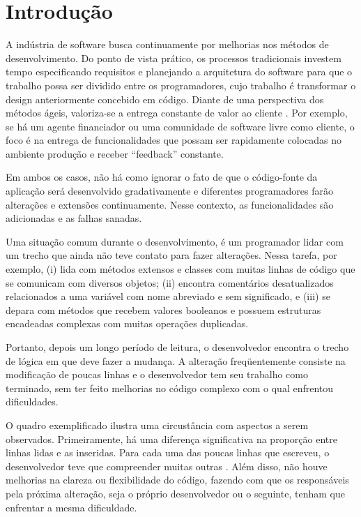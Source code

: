 \chapter{Introdução}
\label{chap:introducao}

A indústria de software busca continuamente por melhorias nos métodos
de desenvolvimento. Do ponto de vista prático, os processos tradicionais investem tempo especificando requisitos
e planejando a arquitetura do software para que o trabalho possa ser dividido entre os
programadores, cujo trabalho é transformar o design anteriormente concebido em código.
Diante de uma perspectiva dos métodos ágeis, valoriza-se a entrega constante 
de valor ao cliente \cite{}. Por exemplo, se há um agente financiador ou uma comunidade de software livre
como cliente, o foco é na entrega de funcionalidades que possam ser rapidamente colocadas
no ambiente produção e receber ``feedback'' constante.

Em ambos os casos, não há como ignorar o fato de que o código-fonte da aplicação será
desenvolvido gradativamente e diferentes programadores farão alterações e extensões
continuamente. Nesse contexto, as funcionalidades são adicionadas e as falhas sanadas.

Uma situação comum durante o desenvolvimento, é um programador lidar com um trecho que
ainda não teve contato para fazer alterações. Nessa tarefa, por exemplo, (i) lida com métodos extensos e classes
com muitas linhas de código que se comunicam com diversos objetos; (ii) encontra comentários
desatualizados relacionados a uma variável com nome abreviado e sem significado, e (iii) se depara com métodos que
recebem valores booleanos e possuem estruturas encadeadas complexas com muitas operações duplicadas.

Portanto, depois um longo período de leitura, o desenvolvedor encontra o trecho de lógica em que deve 
fazer a mudança. A alteração freqüentemente consiste na modificação de poucas linhas e o 
desenvolvedor tem seu trabalho como terminado, sem ter feito melhorias no código complexo com o qual enfrentou dificuldades.

O quadro exemplificado ilustra uma circustância com aspectos a serem observados.
Primeiramente, há uma diferença significativa na proporção entre linhas lidas e as inseridas.
Para cada uma das poucas linhas que escreveu, o desenvolvedor teve que compreender muitas
outras \cite{}. Além disso, não houve melhorias na clareza ou flexibilidade do código, fazendo 
com que os responsáveis pela próxima alteração, seja o próprio desenvolvedor ou o seguinte,
tenham que enfrentar a mesma dificuldade.

